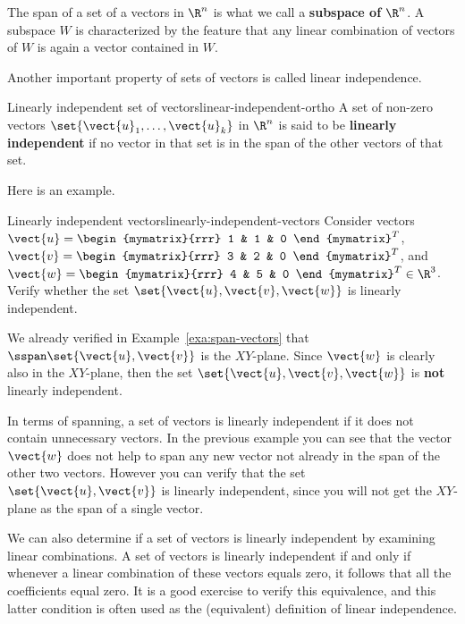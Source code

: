 The span of a set of a vectors in $\R^n$ is what we call a \textbf{subspace of $\R^n$}. A subspace $W$ is characterized by the feature that any linear combination of vectors of $W$ is again a vector contained in $W$.

Another important property of sets of vectors is called linear independence.

\begin{definition}{Linearly independent set of vectors}{linear-independent-ortho}
A set of non-zero vectors $\set{\vect{u}_1,\ldots,\vect{u}_k}$ in $\R^{n}$ is said to be
\textbf{linearly independent}
 if no vector in that set is in the span of the other vectors of that set.
\end{definition}

Here is an example.

\begin{example}{Linearly independent vectors}{linearly-independent-vectors}
Consider vectors $\vect{u}=\begin{mymatrix}{rrr}
1  & 1 & 0
\end{mymatrix}^T$,
$\vect{v}=\begin{mymatrix}{rrr}
3  & 2 & 0
\end{mymatrix}^T$, and
$\vect{w}=\begin{mymatrix}{rrr}
4  & 5 & 0
\end{mymatrix}^T  \in \R^{3}$.
Verify whether the set $\set{\vect{u}, \vect{v}, \vect{w}}$ is linearly independent.
\end{example}

\begin{solution}
We already verified in Example~\ref{exa:span-vectors} that
$\sspan \set{\vect{u}, \vect{v}}$ is the $XY$-plane. Since $\vect{w}$
is clearly also in the $XY$-plane, then the set $\set{\vect{u}, \vect{v},
\vect{w}}$ is \textbf{not} linearly independent.
\end{solution}

In terms of spanning, a set of vectors is linearly independent if it
does not contain unnecessary vectors. In the previous example you
can see that the vector $\vect{w}$ does not help to span any new vector
not already in the span of the other two vectors. However you can
verify that the set $\set{\vect{u}, \vect{v}}$ is linearly independent,
since you will not get the $XY$-plane as the span of a single vector.

We can also determine if a set of vectors is linearly independent by examining linear combinations. A set of vectors is linearly independent if and only if
whenever a linear combination of these vectors equals zero, it follows
that all the coefficients equal zero. It is a good exercise to verify
this equivalence, and this latter condition is often used as the
(equivalent) definition of linear independence.

